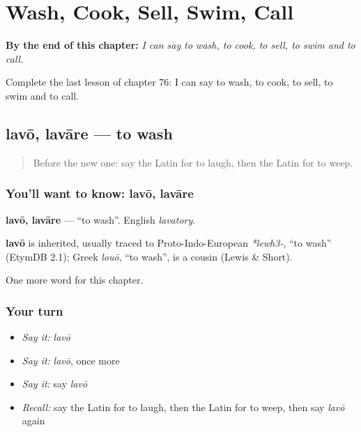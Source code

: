 
\chapter{Wash, Cook, Sell, Swim, Call}
\label{ch:la-wash-cook-sell-swim-call}

\begin{chapteropening}
\textbf{By the end of this chapter:} \emph{I can say to wash, to cook, to sell, to swim and to call.}

Complete the last lesson of chapter 76: I can say to wash, to cook, to sell, to swim and to call.
\end{chapteropening}

\section[lavō, lavāre]{lavō, lavāre — to wash}

\label{lesson:LA-C76-lavo}



\begin{quote}
Before the new one: say the Latin for to laugh, then the Latin for to weep.
\end{quote}

\subsection*{You'll want to know: lavō, lavāre}
\textbf{lavō, lavāre} — \textquotedblleft{}to wash\textquotedblright{}. English \emph{lavatory}.

\begin{cousinweb}
\textbf{lavō} is inherited, usually traced to Proto-Indo-European \emph{*lewh3-}, \textquotedblleft{}to wash\textquotedblright{} (EtymDB 2.1); Greek \emph{louō}, \textquotedblleft{}to wash\textquotedblright{}, is a cousin (Lewis \& Short).
\end{cousinweb}

\begin{grammarlens}[title={What you've built}]
One more word for this chapter.
\end{grammarlens}

\subsection*{Your turn}
\begin{itemize}
\raggedright
  \item \emph{Say it:} \emph{lavō}
  \item \emph{Say it:} \emph{lavō}, once more
  \item \emph{Say it:} say \emph{lavō}
  \item \emph{Recall:} say the Latin for to laugh, then the Latin for to weep, then say \emph{lavō} again
\end{itemize}

